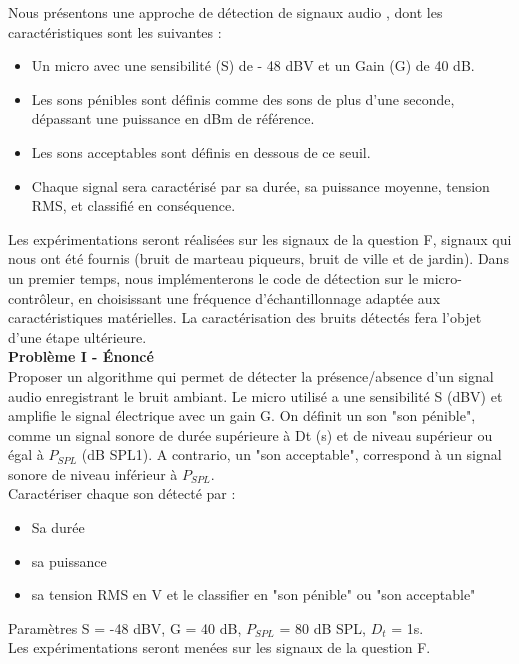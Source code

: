 Nous présentons une approche de détection de signaux audio , dont les caractéristiques sont les suivantes :
\begin{itemize}
    \item Un micro avec une sensibilité (S) de - 48 dBV et un Gain (G) de 40 dB.
    \item Les sons pénibles sont définis comme des sons de plus d'une seconde, dépassant une puissance en dBm de référence.
    \item Les sons acceptables sont définis en dessous de ce seuil.
    \item Chaque signal sera caractérisé par sa durée, sa puissance moyenne, tension RMS, et classifié en conséquence. 
\end{itemize}

Les expérimentations seront réalisées sur les signaux de la question F, signaux qui nous ont été fournis (bruit de marteau piqueurs, bruit de ville et de jardin). Dans un premier temps, nous implémenterons le code de détection sur le micro-contrôleur, en choisissant une fréquence d'échantillonnage adaptée aux caractéristiques matérielles. La caractérisation des bruits détectés fera l'objet d'une étape ultérieure.
\newline 
\\
 \textbf{Problème I - Énoncé } \ \\
Proposer un algorithme qui permet de détecter la présence/absence d’un signal audio enregistrant le bruit ambiant.
Le micro utilisé a une sensibilité S (dBV) et amplifie le signal électrique avec un gain G. On définit un son "son pénible", comme un signal sonore de durée supérieure à Dt (s) et de niveau supérieur ou égal à $P_{SPL}$ (dB SPL1). A contrario, un "son acceptable", correspond à un signal sonore de niveau inférieur à $P_{SPL}$.
\\
Caractériser chaque son détecté par :
\begin{itemize}
    \item Sa durée 
    \item sa puissance
    \item sa tension RMS en V et le classifier en "son pénible" ou "son acceptable"
\end{itemize}
Paramètres S = -48 dBV, G = 40 dB, $P_{SPL}$ = 80 dB SPL, $D_t$ = 1s.
\\
Les expérimentations seront menées sur les signaux de la question F.







